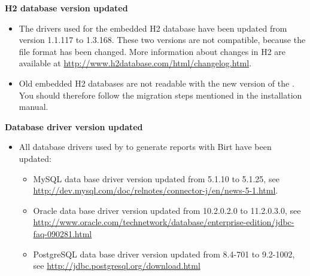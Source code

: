 \textbf{H2 database version updated}
\begin{itemize}
\item The drivers used for the embedded H2 database have been updated from version 1.1.117 to 1.3.168. These two versions are not compatible, because the file format has been changed. More information about changes in H2 are available at \url{http://www.h2database.com/html/changelog.html}.
\item Old embedded H2 databases are not readable with the new version
    of the \ite{}. You should therefore follow the migration steps mentioned in the installation manual. 
 
\end{itemize}

\textbf{Database driver version updated}
\begin{itemize}
\item All database drivers used by \ite to generate reports with Birt have been
    updated:
    \begin{itemize}
    \item MySQL data base driver version updated from 5.1.10 to 5.1.25,
        see \url{http://dev.mysql.com/doc/relnotes/connector-j/en/news-5-1.html}.
    \item Oracle data base driver version updated from 10.2.0.2.0 to 11.2.0.3.0,
        see \url{http://www.oracle.com/technetwork/database/enterprise-edition/jdbc-faq-090281.html}
    \item PostgreSQL data base driver version updated from 8.4-701 to 9.2-1002,
        see \url{http://jdbc.postgresql.org/download.html}
    \end{itemize}
\end{itemize}

